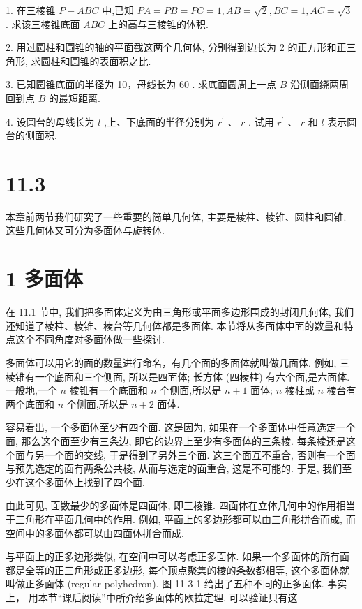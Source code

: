 \documentclass[10pt]{article}
\begin{document}
1. 在三棱锥 \(P - {ABC}\) 中,已知 \({PA} = {PB} = {PC} = 1,{AB} = \sqrt{2},{BC} = 1,{AC} = \sqrt{3}\) . 求该三棱锥底面 \({ABC}\) 上的高与三棱锥的体积.

2. 用过圆柱和圆锥的轴的平面截这两个几何体, 分别得到边长为 2 的正方形和正三角形, 求圆柱和圆锥的表面积之比.

3. 已知圆锥底面的半径为 10，母线长为 60 . 求底面圆周上一点 \(B\) 沿侧面绕两周回到点 \(B\) 的最短距离.

4. 设圆台的母线长为 \(l\) ,上、下底面的半径分别为 \({r}^{\prime }\text{ 、 }r\) . 试用 \({r}^{\prime }\text{ 、 }r\) 和 \(l\) 表示圆台的侧面积.

\section*{11.3}

本章前两节我们研究了一些重要的简单几何体, 主要是棱柱、棱锥、圆柱和圆锥. 这些几何体又可分为多面体与旋转体.

\section*{1 多面体}

在 11.1 节中, 我们把多面体定义为由三角形或平面多边形围成的封闭几何体, 我们还知道了棱柱、棱锥、棱台等几何体都是多面体. 本节将从多面体中面的数量和特点这个不同角度对多面体做一些探讨.

多面体可以用它的面的数量进行命名，有几个面的多面体就叫做几面体. 例如, 三棱锥有一个底面和三个侧面, 所以是四面体; 长方体 (四棱柱) 有六个面,是六面体. 一般地,一个 \(n\) 棱锥有一个底面和 \(n\) 个侧面,所以是 \(n + 1\) 面体; \(n\) 棱柱或 \(n\) 棱台有两个底面和 \(n\) 个侧面,所以是 \(n + 2\) 面体.

容易看出, 一个多面体至少有四个面. 这是因为, 如果在一个多面体中任意选定一个面, 那么这个面至少有三条边, 即它的边界上至少有多面体的三条棱. 每条棱还是这个面与另一个面的交线, 于是得到了另外三个面. 这三个面互不重合, 否则有一个面与预先选定的面有两条公共棱, 从而与选定的面重合, 这是不可能的. 于是, 我们至少在这个多面体上找到了四个面.

由此可见, 面数最少的多面体是四面体, 即三棱锥. 四面体在立体几何中的作用相当于三角形在平面几何中的作用. 例如, 平面上的多边形都可以由三角形拼合而成, 而空间中的多面体都可以由四面体拼合而成.

与平面上的正多边形类似, 在空间中可以考虑正多面体. 如果一个多面体的所有面都是全等的正三角形或正多边形, 每个顶点聚集的棱的条数都相等, 这个多面体就叫做正多面体 (regular polyhedron). 图 11-3-1 给出了五种不同的正多面体. 事实上， 用本节“课后阅读”中所介绍多面体的欧拉定理, 可以验证只有这
\end{document}
